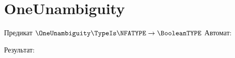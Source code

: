 \section{OneUnambiguity}
\begin{frame}{Предикат $\OneUnambiguity\TypeIs\NFATYPE\to\BooleanTYPE$}
	Автомат:


	Результат:


\end{frame}
